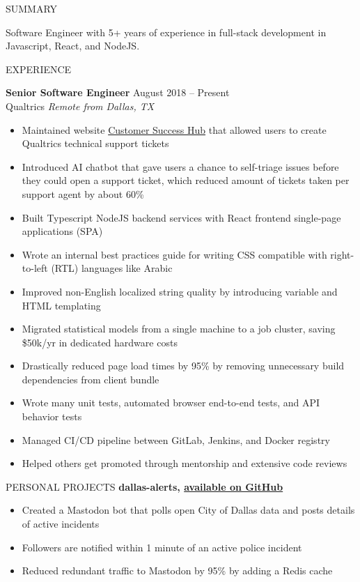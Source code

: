 \documentclass{resume} %
\begin{document}
\begin{rSection}{SUMMARY}

	{Software Engineer with 5+ years of experience in full-stack development in Javascript, React, and NodeJS.}

\end{rSection}


\begin{rSection}{EXPERIENCE}

	\textbf{Senior Software Engineer} \hfill August 2018 -- Present\\
	Qualtrics \hfill \textit{Remote from Dallas, TX}
	\begin{itemize}
		\itemsep -3pt {}
		\item Maintained website \href{https://support-portal.qualtrics.com/}{Customer Success Hub} that allowed users to create Qualtrics technical support tickets
		\item Introduced AI chatbot that gave users a chance to self-triage issues before they could open a support ticket, which reduced amount of tickets taken per support agent by about 60\%
		\item Built Typescript NodeJS backend services with React frontend single-page applications (SPA)
		\item Wrote an internal best practices guide for writing CSS compatible with right-to-left (RTL) languages like Arabic
		\item Improved non-English localized string quality by introducing variable and HTML templating
		\item Migrated statistical models from a single machine to a job cluster, saving \$50k/yr in dedicated hardware costs
		\item Drastically reduced page load times by 95\% by removing unnecessary build dependencies from client bundle
		\item Wrote many unit tests, automated browser end-to-end tests, and API behavior tests
		\item Managed CI/CD pipeline between GitLab, Jenkins, and Docker registry
		\item Helped others get promoted through mentorship and extensive code reviews
	\end{itemize}
\end{rSection}

\begin{rSection}{PERSONAL PROJECTS}
	\textbf{dallas-alerts, \href{https://github.com/kevinyou/dallas-alerts}{available on GitHub}}
	\begin{itemize}
		\itemsep -3pt {}
		\item Created a Mastodon bot that polls open City of Dallas data and posts details of active incidents
		\item Followers are notified within 1 minute of an active police incident
		\item Reduced redundant traffic to Mastodon by 95\% by adding a Redis cache

	\end{itemize}
\end{rSection}
\end{document}
